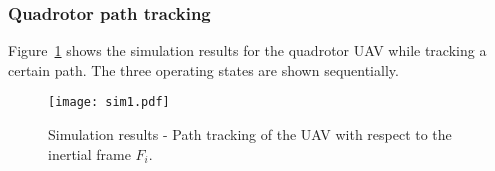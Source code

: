 \documentclass[a4paper, 10pt, conference]{ieeeconf}
\begin{document}
\subsubsection{Quadrotor path tracking}
Figure~\ref{fig:track_uav} shows the simulation results for the quadrotor UAV
while tracking a certain path. The three operating states are shown sequentially.

%
%
%
%
%
%
%
%
\begin{figure}[t]
\centering
  \texttt{[image: sim1.pdf]}
  \caption{Simulation results - Path tracking of the UAV with respect to the inertial frame $F_i$.}
  \label{fig:track_uav}
\end{figure}
\end{document}
